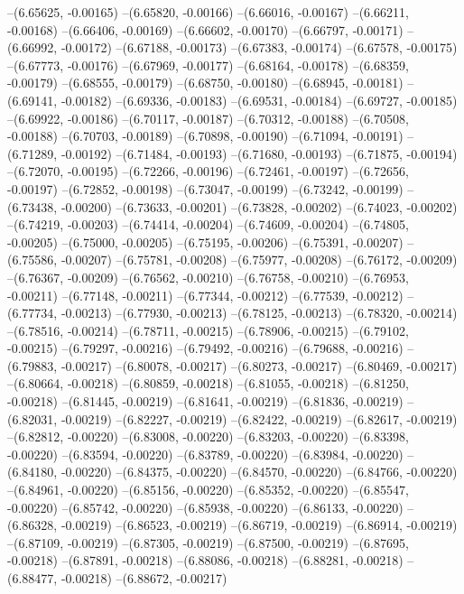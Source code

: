 --(6.65625, -0.00165)
--(6.65820, -0.00166)
--(6.66016, -0.00167)
--(6.66211, -0.00168)
--(6.66406, -0.00169)
--(6.66602, -0.00170)
--(6.66797, -0.00171)
--(6.66992, -0.00172)
--(6.67188, -0.00173)
--(6.67383, -0.00174)
--(6.67578, -0.00175)
--(6.67773, -0.00176)
--(6.67969, -0.00177)
--(6.68164, -0.00178)
--(6.68359, -0.00179)
--(6.68555, -0.00179)
--(6.68750, -0.00180)
--(6.68945, -0.00181)
--(6.69141, -0.00182)
--(6.69336, -0.00183)
--(6.69531, -0.00184)
--(6.69727, -0.00185)
--(6.69922, -0.00186)
--(6.70117, -0.00187)
--(6.70312, -0.00188)
--(6.70508, -0.00188)
--(6.70703, -0.00189)
--(6.70898, -0.00190)
--(6.71094, -0.00191)
--(6.71289, -0.00192)
--(6.71484, -0.00193)
--(6.71680, -0.00193)
--(6.71875, -0.00194)
--(6.72070, -0.00195)
--(6.72266, -0.00196)
--(6.72461, -0.00197)
--(6.72656, -0.00197)
--(6.72852, -0.00198)
--(6.73047, -0.00199)
--(6.73242, -0.00199)
--(6.73438, -0.00200)
--(6.73633, -0.00201)
--(6.73828, -0.00202)
--(6.74023, -0.00202)
--(6.74219, -0.00203)
--(6.74414, -0.00204)
--(6.74609, -0.00204)
--(6.74805, -0.00205)
--(6.75000, -0.00205)
--(6.75195, -0.00206)
--(6.75391, -0.00207)
--(6.75586, -0.00207)
--(6.75781, -0.00208)
--(6.75977, -0.00208)
--(6.76172, -0.00209)
--(6.76367, -0.00209)
--(6.76562, -0.00210)
--(6.76758, -0.00210)
--(6.76953, -0.00211)
--(6.77148, -0.00211)
--(6.77344, -0.00212)
--(6.77539, -0.00212)
--(6.77734, -0.00213)
--(6.77930, -0.00213)
--(6.78125, -0.00213)
--(6.78320, -0.00214)
--(6.78516, -0.00214)
--(6.78711, -0.00215)
--(6.78906, -0.00215)
--(6.79102, -0.00215)
--(6.79297, -0.00216)
--(6.79492, -0.00216)
--(6.79688, -0.00216)
--(6.79883, -0.00217)
--(6.80078, -0.00217)
--(6.80273, -0.00217)
--(6.80469, -0.00217)
--(6.80664, -0.00218)
--(6.80859, -0.00218)
--(6.81055, -0.00218)
--(6.81250, -0.00218)
--(6.81445, -0.00219)
--(6.81641, -0.00219)
--(6.81836, -0.00219)
--(6.82031, -0.00219)
--(6.82227, -0.00219)
--(6.82422, -0.00219)
--(6.82617, -0.00219)
--(6.82812, -0.00220)
--(6.83008, -0.00220)
--(6.83203, -0.00220)
--(6.83398, -0.00220)
--(6.83594, -0.00220)
--(6.83789, -0.00220)
--(6.83984, -0.00220)
--(6.84180, -0.00220)
--(6.84375, -0.00220)
--(6.84570, -0.00220)
--(6.84766, -0.00220)
--(6.84961, -0.00220)
--(6.85156, -0.00220)
--(6.85352, -0.00220)
--(6.85547, -0.00220)
--(6.85742, -0.00220)
--(6.85938, -0.00220)
--(6.86133, -0.00220)
--(6.86328, -0.00219)
--(6.86523, -0.00219)
--(6.86719, -0.00219)
--(6.86914, -0.00219)
--(6.87109, -0.00219)
--(6.87305, -0.00219)
--(6.87500, -0.00219)
--(6.87695, -0.00218)
--(6.87891, -0.00218)
--(6.88086, -0.00218)
--(6.88281, -0.00218)
--(6.88477, -0.00218)
--(6.88672, -0.00217)
